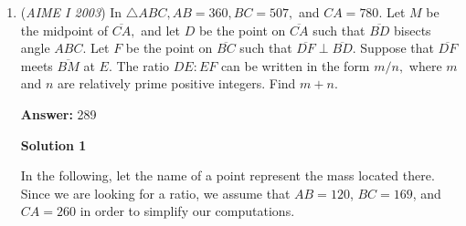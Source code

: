 \begin{enumerate}
 Thus we have $\frac{m'}{n} = 0.251\ldots$, or 

 $\frac{251}{1000} \le \frac{m'}{n} < \frac{252}{1000} \Longleftrightarrow 251n \le 1000m' < 252n \Longleftrightarrow n \le 250(4m'-n) < 2n.$

 As $4m' > n$, we know that the minimum value of $4m' - n$ is $1$; hence we need $250 < 2n \Longrightarrow 125 < n$. Since $4m' - n = 1$, we need $n + 1$ to be divisible by $4$, and this first occurs when $n = \boxed{ 127 }$ (note that if $4m'-n > 1$, then $n > 250$). Indeed, this gives $m' = 32$ and the fraction $\frac {32}{127}\approx 0.25196 \ldots$).

 



\textbf{Solution 2}

Rewrite the problem as having the smallest $n$ such that we can find an positive integer $m$ such that $0<\frac{m}{n}-\frac{251}{1000}<\frac{1}{1000}$.

 We can rewrite the expression as $\frac{1000m-251n}{1000n}$, and we need $251n+x$ (where $x$ is the difference in the fraction, and ranging from $(1,2,...n-1)$ to be $0$ mod $1000$. We see that $n$ must be $3$ mod $4$ to have this happen (as this reduces the distance between the expression and $1000$.

 Rewriting $n$ as $4k+3$, we get that $251(4k+3)+(4k+2)$ turns into $8k+755$, and this has to be greater than or equal to $1000$. The least $k$ that satisfies this is $31$, and we consequently get that the least value of $n$ is $127$. -dragoon -minor edits by Mathkiddie

 


	\item (\textit{AIME I 2003}) In $\triangle ABC, AB = 360, BC = 507,$ and $CA = 780.$ Let $M$ be the midpoint of $\overline{CA},$ and let $D$ be the point on $\overline{CA}$ such that $\overline{BD}$ bisects angle $ABC.$ Let $F$ be the point on $\overline{BC}$ such that $\overline{DF} \perp \overline{BD}.$ Suppose that $\overline{DF}$ meets $\overline{BM}$ at $E.$ The ratio $DE: EF$ can be written in the form $m/n,$ where $m$ and $n$ are relatively prime positive integers. Find $m + n.$

 \textbf{Answer: }289



\textbf{Solution 1}

In the following, let the name of a point represent the mass located there. Since we are looking for a ratio, we assume that $AB=120$, $BC=169$, and $CA=260$ in order to simplify our computations.


\end{enumerate}
